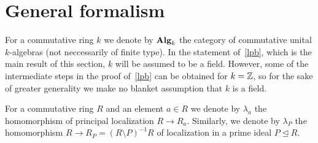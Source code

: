 \documentclass[oneside, 11pt]{amsart} \pdfoutput=1
\begin{document}
\section{General formalism}
\begin{comment}
The aim of this section is to formulate and prove Lindel--Popescu Theorem, a certain formal statement, which gives a sufficient condition for a general group-valued functor to be homotopy invariant. Later, in~\cref{sec:main} this result is applied to the functor $K_2$. Some of the machinery developed in this section also will be useful in the study of the $K_2$-analogue of Gersten's conjecture, see~\cref{sec:K2-GC}.

Let us briefly recall the historical context, which might help to explain our choice of the name for~\cref{lpb}. Recall that H.~Lindel's paper~\cite{Li81} has settled the geometric case of the Bass--Quillen conjecture for all regular $k$-algebras $R$ essentially of finite type over $k$. Later T.~Vorst has used Lindel's result in the proof of the homotopy invariance for the unstable $\K_1$-functor, see~\cite{Vo81}. Recall that Vorst's result asserts that $\K_{1,r}(R[t]) \cong \K_{1,r}(R)$ for $r\geq 3$ and a regular ring $R$ essentially finite type over a field. Next, D.~Popescu proved Bass--Quillen conjecture in equicharacteristic case~\cite{Po90}.  Finally, in her recent work~\cite{Sta14} A.~Stavrova has combined Vorst's theorem with a theorem of Popescu and obtained a more general homotopy invariance $\K_1^G(A[t]) \cong \K_1^G(A)$ for an arbitrary regular algebra $A$ over a perfect field $F$ and a sufficiently isotropic reductive group $G$ defined over $F$, see~\cite[Theorem~1.3]{Sta14}.

\subsection{A general Lindel--Popescu-type theorem}
\end{comment}
For a commutative ring $k$ we denote by ${\normalfont\textbf{Alg}}_k$ the category of commutative unital $k$-algebras (not neccessarily of finite type). In the statement of~\cref{lpb}, which is the main result of this section, $k$ will be assumed to be a field. However, some of the intermediate steps in the proof of~\cref{lpb} can be obtained for $k=\mathbb{Z}$, so for the sake of greater generality we make no blanket assumption that $k$ is a field.  

For a commutative ring $R$ and an element $a\in R$ we denote by $\lambda_a$ the homomorphism of principal localization $R \to R_a$. Similarly, we denote by $\lambda_P$ the homomorphism $R \to R_P = (R\setminus P)^{-1}R$ of localization in a prime ideal $P \trianglelefteq R$. 
\end{document}
